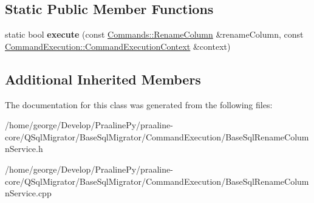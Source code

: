\subsection*{Static Public Member Functions}
\begin{DoxyCompactItemize}
\item 
\mbox{\label{class_q_sql_migrator_1_1_command_execution_1_1_base_sql_rename_column_service_a96607217501c92369a3ef83651ab0918}} 
static bool {\bfseries execute} (const \hyperlink{class_q_sql_migrator_1_1_commands_1_1_rename_column}{Commands\+::\+Rename\+Column} \&rename\+Column, const \hyperlink{class_q_sql_migrator_1_1_command_execution_1_1_command_execution_context}{Command\+Execution\+::\+Command\+Execution\+Context} \&context)
\end{DoxyCompactItemize}
\subsection*{Additional Inherited Members}


The documentation for this class was generated from the following files\+:\begin{DoxyCompactItemize}
\item 
/home/george/\+Develop/\+Praaline\+Py/praaline-\/core/\+Q\+Sql\+Migrator/\+Base\+Sql\+Migrator/\+Command\+Execution/Base\+Sql\+Rename\+Column\+Service.\+h\item 
/home/george/\+Develop/\+Praaline\+Py/praaline-\/core/\+Q\+Sql\+Migrator/\+Base\+Sql\+Migrator/\+Command\+Execution/Base\+Sql\+Rename\+Column\+Service.\+cpp\end{DoxyCompactItemize}

